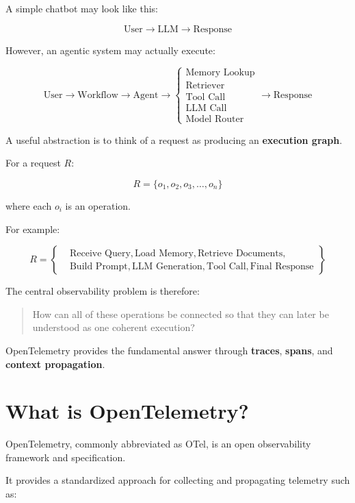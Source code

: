 \documentclass[11pt,a4paper]{article}
\begin{document}
A simple chatbot may look like this:

\[
\text{User}
\rightarrow
\text{LLM}
\rightarrow
\text{Response}
\]

However, an agentic system may actually execute:

\[
\text{User}
\rightarrow
\text{Workflow}
\rightarrow
\text{Agent}
\rightarrow
\begin{cases}
\text{Memory Lookup}\\
\text{Retriever}\\
\text{Tool Call}\\
\text{LLM Call}\\
\text{Model Router}
\end{cases}
\rightarrow
\text{Response}
\]

A useful abstraction is to think of a request as producing an \textbf{execution graph}.

For a request $R$:

\[
R = \{o_1, o_2, o_3, \ldots, o_n\}
\]

where each $o_i$ is an operation.

For example:

\[
R =
\left\{
\begin{aligned}
&\text{Receive Query}, \text{Load Memory}, \text{Retrieve Documents}, \\
&\text{Build Prompt}, \text{LLM Generation}, \text{Tool Call}, \text{Final Response}
\end{aligned}
\right\}
\]

The central observability problem is therefore:

\begin{quote}
How can all of these operations be connected so that they can later be understood as one coherent execution?
\end{quote}

OpenTelemetry provides the fundamental answer through \textbf{traces}, \textbf{spans}, and \textbf{context propagation}.

\section{What is OpenTelemetry?}

OpenTelemetry, commonly abbreviated as OTel, is an open observability framework and specification.

It provides a standardized approach for collecting and propagating telemetry such as:
\end{document}
